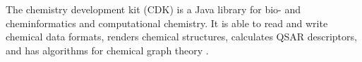 The chemistry development kit (CDK) is a Java library for bio- and cheminformatics and computational chemistry. It is able to read and write chemical data formats, renders chemical structures, calculates QSAR descriptors, and has algorithms for chemical graph theory \cite{Steinbeck_2003}\cite{Steinbeck_2006}. 
